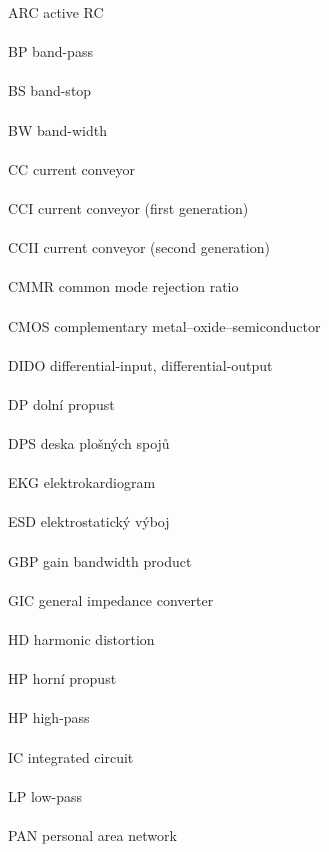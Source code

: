 \vspace*{0.5cm}
ARC \hfill active RC \\ \\
BP \hfill band-pass \\ \\
BS \hfill band-stop \\ \\
BW \hfill band-width \\ \\
CC \hfill current conveyor \\ \\
CCI \hfill current conveyor (first generation) \\ \\
CCII \hfill current conveyor (second generation) \\ \\
CMMR \hfill common mode rejection ratio \\ \\
CMOS \hfill complementary metal–oxide–semiconductor \\ \\
DIDO \hfill differential-input, differential-output \\ \\
DP \hfill dolní propust \\ \\
DPS \hfill deska plošných spojů \\ \\
EKG \hfill elektrokardiogram \\ \\
ESD \hfill elektrostatický výboj \\ \\
GBP \hfill gain bandwidth product \\ \\
GIC \hfill general impedance converter \\ \\
HD \hfill harmonic distortion \\ \\
HP \hfill horní propust \\ \\
HP \hfill high-pass \\ \\
IC \hfill integrated circuit \\ \\
LP \hfill low-pass \\ \\
PAN \hfill personal area network \\ \\
